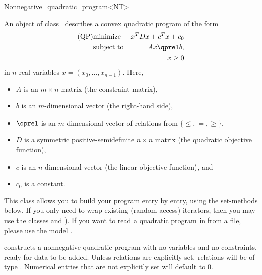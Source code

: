 \begin{ccRefClass}{Nonnegative_quadratic_program<NT>}


\ccDefinition
An object of class \ccRefName\ describes a convex quadratic program of the form
\begin{eqnarray*}
\mbox{(QP)}& \mbox{minimize} & x^{T}Dx+c^{T}x+c_0 \\
&\mbox{subject to}   & Ax\qprel b, \\
&                    & x \geq 0
\end{eqnarray*}
in $n$ real variables $x=(x_0,\ldots,x_{n-1})$.
Here, 
\begin{itemize}
\item $A$ is an $m\times n$ matrix (the constraint matrix), 
\item $b$ is an $m$-dimensional vector (the right-hand side),
\item $\qprel$ is an $m$-dimensional vector of relations 
from $\{\leq, =, \geq\}$, 
\item $D$ is a symmetric positive-semidefinite $n\times n$ matrix (the
  quadratic objective function),
\item $c$ is an $n$-dimensional vector (the linear objective
  function), and 
\item $c_0$ is a constant.
\end{itemize}

This class allows you to build your program entry by entry, using
the set-methods below. If you only need to wrap existing (random-access)
iterators, then you may use the classes 
 and ). If you want
to read a quadratic program in  from a file, please use
the model .

\ccIsModel
{}

\ccTypes


\ccCreation
\ccIndexClassCreation
{}

{constructs a nonnegative quadratic program with no variables and no 
constraints, ready for data to be added. Unless relations are explicitly set, 
relations will be of type . Numerical entries that are not 
explicitly set will default to $0$.}


\end{ccRefClass}

